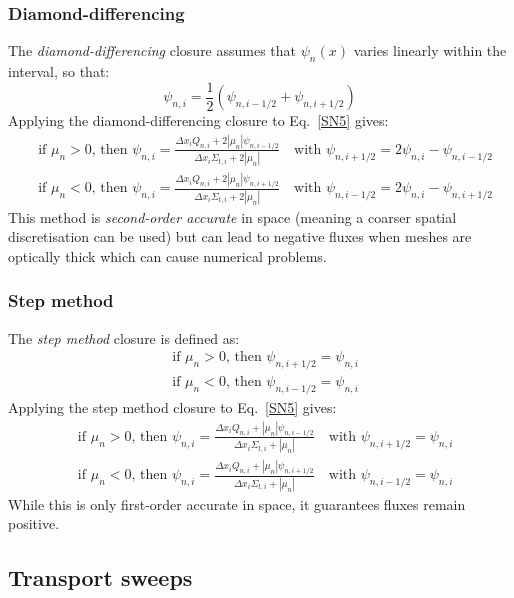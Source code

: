 \documentclass{article}
\begin{document}
\subsubsection{Diamond-differencing}
The \textit{diamond-differencing} closure assumes that $\psi_n(x)$ varies linearly within the interval, so that:
\begin{equation}\label{SN5DD}
    \psi_{n,i}=\frac{1}{2}\left(\psi_{n,i-1/2}+\psi_{n,i+1/2}\right)
\end{equation}
Applying the diamond-differencing closure to Eq.~\eqref{SN5} gives:
\begin{align}
    &\text{if }\mu_n>0\text{, then }\psi_{n,i}=\frac{\Delta x_iQ_{n,i}+2|\mu_n|\psi_{n,i-1/2}}{\Delta x_i\Sigma_{t,i}+2|\mu_n|}\quad\text{with } \psi_{n,i+1/2}=2\psi_{n,i}-\psi_{n,i-1/2}\label{SN5DDr}\\
    &\text{if }\mu_n<0\text{, then }\psi_{n,i}=\frac{\Delta x_iQ_{n,i}+2|\mu_n|\psi_{n,i+1/2}}{\Delta x_i\Sigma_{t,i}+2|\mu_n|}\quad\text{with }\psi_{n,i-1/2}=2\psi_{n,i}-\psi_{n,i+1/2}\label{SN5DDl}
\end{align}
This method is \textit{second-order accurate} in space (meaning a coarser spatial discretisation can be used) but can lead to negative fluxes when meshes are optically thick which can cause numerical problems.

\subsubsection{Step method}
The \textit{step method} closure is defined as:
\begin{align}
    &\text{if }\mu_n>0\text{, then }\psi_{n,i+1/2}=\psi_{n,i}\\
    &\text{if }\mu_n<0\text{, then }\psi_{n,i-1/2}=\psi_{n,i}
\end{align}
Applying the step method closure to Eq.~\eqref{SN5} gives:
\begin{align}
    &\text{if }\mu_n>0\text{, then }\psi_{n,i}=\frac{\Delta x_iQ_{n,i}+|\mu_n|\psi_{n,i-1/2}}{\Delta x_i\Sigma_{t,i}+|\mu_n|}\quad\text{with } \psi_{n,i+1/2}=\psi_{n,i}\label{SN5SMr}\\
    &\text{if }\mu_n<0\text{, then }\psi_{n,i}=\frac{\Delta x_iQ_{n,i}+|\mu_n|\psi_{n,i+1/2}}{\Delta x_i\Sigma_{t,i}+|\mu_n|}\quad\text{with }\psi_{n,i-1/2}=\psi_{n,i}\label{SN5SMl}
\end{align}
While this is only first-order accurate in space, it guarantees fluxes remain positive.

\subsection{Transport sweeps}
\end{document}
